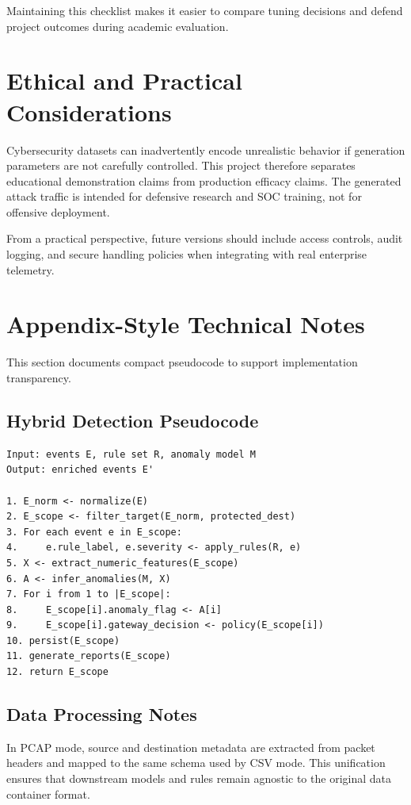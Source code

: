\documentclass[conference]{IEEEtran}
\begin{document}
Maintaining this checklist makes it easier to compare tuning decisions and defend project outcomes during academic evaluation.

\section{Ethical and Practical Considerations}
Cybersecurity datasets can inadvertently encode unrealistic behavior if generation parameters are not carefully controlled. This project therefore separates educational demonstration claims from production efficacy claims. The generated attack traffic is intended for defensive research and SOC training, not for offensive deployment.

From a practical perspective, future versions should include access controls, audit logging, and secure handling policies when integrating with real enterprise telemetry.

\section{Appendix-Style Technical Notes}
This section documents compact pseudocode to support implementation transparency.

\subsection{Hybrid Detection Pseudocode}
\begin{verbatim}
Input: events E, rule set R, anomaly model M
Output: enriched events E'

1. E_norm <- normalize(E)
2. E_scope <- filter_target(E_norm, protected_dest)
3. For each event e in E_scope:
4.     e.rule_label, e.severity <- apply_rules(R, e)
5. X <- extract_numeric_features(E_scope)
6. A <- infer_anomalies(M, X)
7. For i from 1 to |E_scope|:
8.     E_scope[i].anomaly_flag <- A[i]
9.     E_scope[i].gateway_decision <- policy(E_scope[i])
10. persist(E_scope)
11. generate_reports(E_scope)
12. return E_scope
\end{verbatim}

\subsection{Data Processing Notes}
In PCAP mode, source and destination metadata are extracted from packet headers and mapped to the same schema used by CSV mode. This unification ensures that downstream models and rules remain agnostic to the original data container format.
\end{document}

